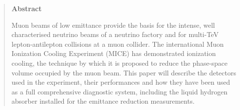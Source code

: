 \begin{quotation}
\begin{center}
\textbf{Abstract}
\end{center}

Muon beams of low emittance provide the basis for the intense, well characterised neutrino beams of a neutrino factory and for multi-TeV lepton-antilepton collisions at a muon collider. The international Muon Ionization Cooling Experiment (MICE) has demonstrated ionization cooling, the technique by which it is proposed to reduce the  phase-space volume occupied by the muon beam. This paper will describe the detectors used in the experiment, their performances and how they have been used as a full comprehensive diagnostic system, including the liquid hydrogen absorber installed for the emittance reduction measurements.

\end{quotation}



%
%       
